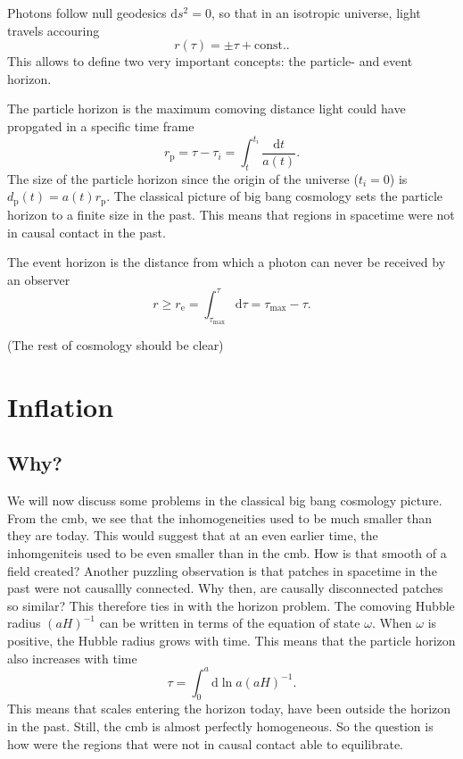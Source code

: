 \documentclass[12pt]{article}
\begin{document}
Photons follow null geodesics $\mathrm{d}s^2 = 0$, so that in an isotropic universe, light travels accouring
\begin{equation}
    r(\tau) = \pm \tau + \mathrm{ const.}.
\end{equation}
This allows to define two very important concepts: the particle- and event horizon.

The particle horizon is the maximum comoving distance light could have propgated in a specific time frame
\begin{equation}
    r_{\mathrm{p}} = \tau - \tau_i = \int_{t}^{t_i} \frac{\mathrm{d}t}{a(t)}.
\end{equation}
The size of the particle horizon since the origin of the universe ($t_i = 0$) is $d_\mathrm{p}(t) = a(t) r_{\mathrm{p}}$. The classical picture of big bang cosmology sets the particle horizon to a finite size in the past. This means that regions in spacetime were not in causal contact in the past. 

The event horizon is the distance from which a photon can never be received by an observer
\begin{equation}
    r \geq r_\mathrm{e} = \int_{\tau_\mathrm{max}}^{\tau} \mathrm{d}\tau = \tau_\mathrm{max} - \tau.
\end{equation}

(The rest of cosmology should be clear)


\section{Inflation}
\subsection{Why?}
We will    now discuss some problems in the classical big bang cosmology picture. From the cmb, we see that the inhomogeneities used to be much smaller than they are today. This would suggest that at an even earlier time, the inhomgeniteis used to be even smaller than in the cmb. How is that smooth of a field created? Another puzzling observation is that patches in spacetime in the past were not causallly connected. Why then, are causally disconnected patches so similar? This therefore ties in with the horizon problem. The comoving Hubble radius $(aH)^{-1}$ can be written in terms of the equation of state $\omega$. When $\omega$ is positive, the Hubble radius grows with time. This means that the particle horizon also increases with time 
\begin{equation}
    \tau = \int_{0}^{a}\mathrm{d}\ln a (aH)^{-1}.
\end{equation}
This means that scales entering the horizon today, have been outside the horizon in the past. Still, the cmb is almost perfectly homogeneous. So the question is how were the regions that were not in causal contact able to equilibrate.
\end{document}
